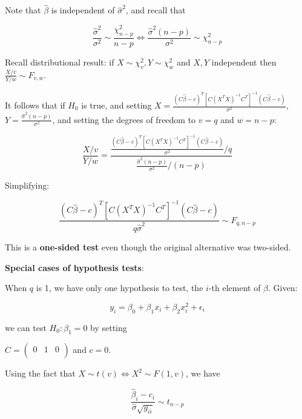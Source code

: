 Note that $\hat{\beta}$ is independent of $\hat{\sigma}^2$, and recall that

\begin{equation}
\frac{\hat{\sigma}^2 }{\sigma^2} \sim \frac{\chi_{n-p}^2}{n-p}  \Leftrightarrow 
\frac{\hat{\sigma}^2 (n-p)}{\sigma^2} \sim \chi_{n-p}^2
\end{equation} 

Recall distributional result: if $X\sim \chi_v^2, Y\sim \chi_w^2$ and $X,Y$ independent then $\frac{X/v}{Y/w}\sim F_{v,w}$.  


It follows that if $H_0$ is true,  and setting
$X=\frac{(C\hat{\beta} - c)^T [C (X^T X)^{-1} C^T]^{-1} (C\hat{\beta} - c)}{ \sigma^2}$,
$Y=\frac{\hat{\sigma}^2 (n-p)}{\sigma^2}$, and setting the degrees of freedom to $v=q$ and $w=n-p$:

\begin{equation}
\frac{X/v}{Y/w}=
\frac{\frac{(C\hat{\beta} - c)^T [C (X^T X)^{-1} C^T]^{-1} (C\hat{\beta} - c)}{ \sigma^2}/q}{\frac{\hat{\sigma}^2 (n-p)}{\sigma^2}/(n-p)}
\end{equation}

Simplifying:

\begin{equation}
\frac{(C\hat{\beta} - c)^T [C (X^T X)^{-1} C^T]^{-1} (C\hat{\beta} - c)}{q\hat{\sigma}^2} \sim F_{q,n-p}
\end{equation}


This is a \textbf{one-sided test} even though the original alternative was two-sided.

\textbf{Special cases of hypothesis tests}:

When $q$ is 1, we have only one hypothesis to test, the $i$-th element of $\beta$. Given:

\begin{equation}
y_i = \beta_0 + \beta_1 x_i + \beta_2 x_i^2+\epsilon_i
\end{equation}

\noindent
we can test $H_0: \beta_1=0$ by setting 

$C=\begin{pmatrix} 
0 & 1 & 0\\
\end{pmatrix}$
and $c=0$.


Using the fact that $X\sim t(v)\Leftrightarrow X^2 \sim F(1,v)$, we have


\begin{equation}
\frac{\hat{\beta}_i - c_i}{\hat{\sigma}\sqrt{g_{ii}}} \sim t_{n-p}
\end{equation}
 

